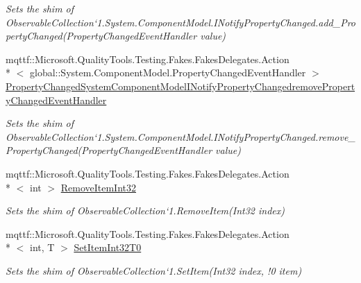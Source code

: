 \begin{DoxyCompactItemize}
\begin{DoxyCompactList}\small\item\em Sets the shim of Observable\-Collection`1.System.\-Component\-Model.\-I\-Notify\-Property\-Changed.\-add\-\_\-\-Property\-Changed(\-Property\-Changed\-Event\-Handler value)\end{DoxyCompactList}\item 
mqttf\-::\-Microsoft.\-Quality\-Tools.\-Testing.\-Fakes.\-Fakes\-Delegates.\-Action\\*
$<$ global\-::\-System.\-Component\-Model.\-Property\-Changed\-Event\-Handler $>$ \hyperlink{class_system_1_1_collections_1_1_object_model_1_1_fakes_1_1_shim_observable_collection_3_01_t_01_4_a7f49654fb66944f0f122605dc79485b9}{Property\-Changed\-System\-Component\-Model\-I\-Notify\-Property\-Changedremove\-Property\-Changed\-Event\-Handler}
\begin{DoxyCompactList}\small\item\em Sets the shim of Observable\-Collection`1.System.\-Component\-Model.\-I\-Notify\-Property\-Changed.\-remove\-\_\-\-Property\-Changed(\-Property\-Changed\-Event\-Handler value)\end{DoxyCompactList}\item 
mqttf\-::\-Microsoft.\-Quality\-Tools.\-Testing.\-Fakes.\-Fakes\-Delegates.\-Action\\*
$<$ int $>$ \hyperlink{class_system_1_1_collections_1_1_object_model_1_1_fakes_1_1_shim_observable_collection_3_01_t_01_4_a84cad1024c17bd33c5ffc6ef4018662d}{Remove\-Item\-Int32}
\begin{DoxyCompactList}\small\item\em Sets the shim of Observable\-Collection`1.Remove\-Item(\-Int32 index)\end{DoxyCompactList}\item 
mqttf\-::\-Microsoft.\-Quality\-Tools.\-Testing.\-Fakes.\-Fakes\-Delegates.\-Action\\*
$<$ int, T $>$ \hyperlink{class_system_1_1_collections_1_1_object_model_1_1_fakes_1_1_shim_observable_collection_3_01_t_01_4_a429e406140539a429fe0963cedaf88c7}{Set\-Item\-Int32\-T0}
\begin{DoxyCompactList}\small\item\em Sets the shim of Observable\-Collection`1.Set\-Item(Int32 index, !0 item)\end{DoxyCompactList}\end{DoxyCompactItemize}


